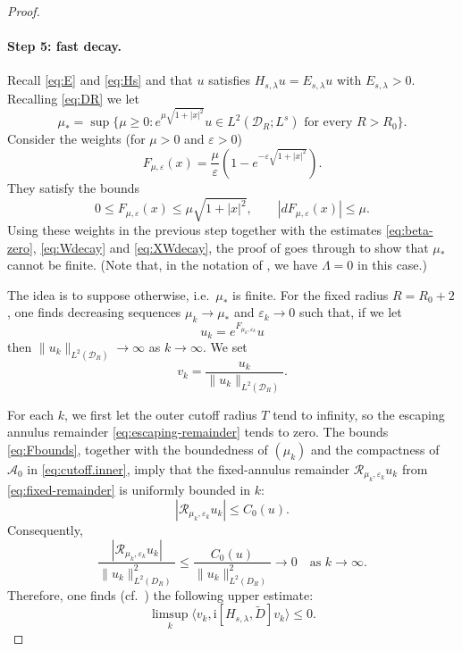 \documentclass{article}
\theoremstyle{definition}
\numberwithin{thm}{section}
\numberwithin{equation}{section}
\newcommand{\ii}{\mathrm i}
\newcommand{\ip}[2]{\langle #1,#2\rangle}
\begin{document}
\begin{proof}
\paragraph{\bf Step 5: fast decay.}  Recall \eqref{eq:E} and \eqref{eq:Hs} and that $u$ satisfies $H_{s,\lambda}u=E_{s,\lambda}u$ with $E_{s,\lambda}>0$. Recalling \eqref{eq:DR} we let 
\begin{equation}\label{eq:mu*}
        \mu_*=\sup\{\mu\geq0: e^{\mu \sqrt{1+|x|^2}}u\in L^2(\mathcal{D}_R;L^s)\text{ for every }R>R_0\}.
\end{equation}
Consider the  weights (for $\mu>0$ and $\varepsilon>0$)
\begin{equation}
        F_{\mu,\varepsilon}(x)=\frac{\mu}{\varepsilon}\left(1-e^{-\varepsilon \sqrt{1+|x|^2}}\right).
\end{equation}
They satisfy the bounds
\begin{equation}\label{eq:Fbounds}
    0\leq F_{\mu,\varepsilon}(x) \leq \mu\sqrt{1+|x|^2},
\qquad
|dF_{\mu,\varepsilon}(x)|\leq\mu.
\end{equation}
Using these weights in the previous step together with the estimates \eqref{eq:beta-zero}, \eqref{eq:Wdecay} and \eqref{eq:XWdecay}, the proof of \cite[Proposition 4.1]{AHK} goes through to show that $\mu_*$ cannot be finite.  (Note that, in the notation of \cite[Proposition 4.1]{AHK}, we have $\Lambda=0$ in this case.)  

The idea is to suppose otherwise, i.e.~$\mu_*$ is finite. For the fixed radius $R=R_0+2$, one finds decreasing sequences $\mu_k\to \mu_*$  and $\varepsilon_k\to 0$ such that, if we let 
\begin{equation}
    u_k=e^{F_{\mu_k,\varepsilon_k}}u
\end{equation}
then $\|u_k\|_{L^2(\mathcal{D}_{R})}\to \infty$ as $k\to\infty$.  We set
\begin{equation}
    v_k=\frac{u_k}{\|u_k\|_{L^2(\mathcal{D}_{R })} }.
\end{equation}

For each $k$, we first let the outer cutoff radius $T$ tend to
infinity, so the escaping annulus remainder \eqref{eq:escaping-remainder} tends to zero. The bounds \eqref{eq:Fbounds}, together with the boundedness of $(\mu_k)$ and the compactness of $\mathcal{A}_0$ in \eqref{eq:cutoff.inner}, imply that the fixed-annulus remainder $\mathcal{R}_{\mu_k, \varepsilon_k}u_k$ from \eqref{eq:fixed-remainder} is uniformly bounded in \(k\):
\begin{equation}
|\mathcal R_{\mu_k,\varepsilon_k}u_k|
\leq C_0(u).
\end{equation}
Consequently,
\begin{equation}
\frac{|\mathcal R_{\mu_k,\varepsilon_k}u_k|}
{\|u_k\|_{L^2(D_R)}^2}
\leq
\frac{C_0(u)}
{\|u_k\|_{L^2(D_R)}^2}
\to0\quad \text{as $k\to\infty$.}
\end{equation}
Therefore, one finds (cf.~\cite[(4.16)]{AHK}) the following upper estimate: 
\begin{equation}\label{eq:bootstrap-upper}
        \limsup_k \ip{v_k}{\ii[H_{s,\lambda},\widetilde D]v_k}\leq0.
\end{equation}


\end{proof}
\end{document}
